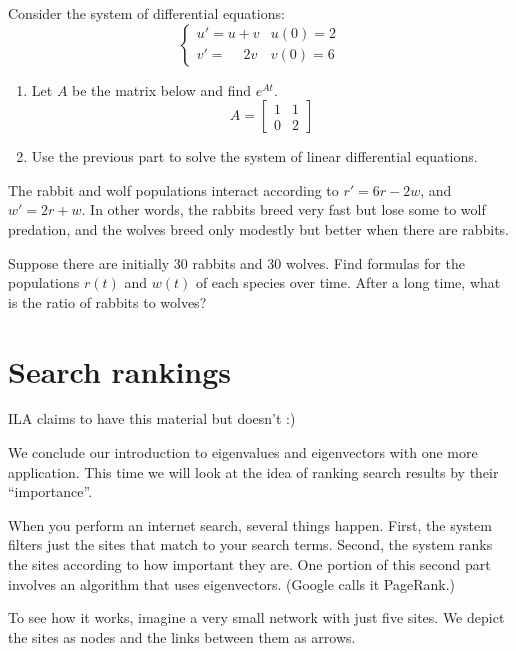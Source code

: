 \documentclass[11pt,oneside]{amsbook}
\theoremstyle{definition}
\theoremstyle{plain}
\theoremstyle{definition}
\theoremstyle{remark}
\numberwithin{equation}{section}
\numberwithin{figure}{section}
\newcounter{activityitem}
\newenvironment{activity}{\begin{list}{\arabic{activityitem}.}{\usecounter{activityitem}\setlength{\itemsep}{.2in}}}{\end{list}}
\begin{document}
\begin{activity}
  \item Consider the system of differential equations:
  \[\begin{cases}
      u'=u+v & u(0)=2\\
      v'=\quad\ 2v & v(0)=6
    \end{cases}
  \]
  \begin{enumerate}
    \item Let $A$ be the matrix below and find $e^{At}$.
    \[A=\begin{bmatrix}1&1\\0&2\end{bmatrix}
    \]
    \item Use the previous part to solve the system of linear differential equations.
  \end{enumerate}
  \item The rabbit and wolf populations interact according to $r'=6r-2w$, and $w'=2r+w$. In other words, the rabbits breed very fast but lose some to wolf predation, and the wolves breed only modestly but better when there are rabbits.

  Suppose there are initially 30 rabbits and 30 wolves. Find formulas for the populations $r(t)$ and $w(t)$ of each species over time. After a long time, what is the ratio of rabbits to wolves?
\end{activity}


\newpage
\section{Search rankings}

ILA claims to have this material but doesn't :)

We conclude our introduction to eigenvalues and eigenvectors with one more application. This time we will look at the idea of ranking search results by their ``importance''.

When you perform an internet search, several things happen. First, the system filters just the sites that match to your search terms. Second, the system ranks the sites according to how important they are. One portion of this second part involves an algorithm that uses eigenvectors. (Google calls it PageRank.)

To see how it works, imagine a very small network with just five sites. We depict the sites as nodes and the links between them as arrows.
\begin{center}
\end{center}
\end{document}
